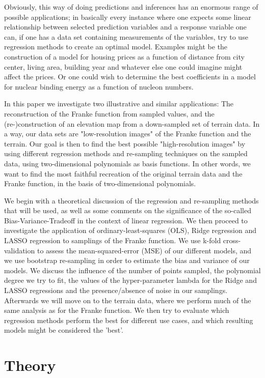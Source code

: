 \documentclass[reprint, english, nofootinbib]{revtex4-2}
\begin{document}
     Obviously, this way of doing predictions and inferences has an enormous range of possible applications; in basically every instance where one expects some linear relationship between selected prediction variables and a response variable one can, if one has a data set containing measurements of the variables, try to use regression methods to create an optimal model. Examples might be the construction of a model for housing prices as a function of distance from city center, living area, building year and whatever else one could imagine might affect the prices. Or one could wish to determine the best coefficients in a model for nuclear binding energy as a function of nucleon numbers.

     In this paper we investigate two illustrative and similar applications: The reconstruction of the Franke function from sampled values, and the (re-)construction of an elevation map from a down-sampled set of terrain data. In a way, our data sets are "low-resolution images" of the Franke function and the terrain. Our goal is then to find the best possible "high-resolution images" by using different regression methods and re-sampling techniques on the sampled data, using two-dimensional polynomials as basis functions. In other words, we want to find the most faithful recreation of the original terrain data and the Franke function, in the basis of two-dimensional polynomials.

     We begin with a theoretical discussion of the regression and re-sampling methods that will be used, as well as some comments on the significance of the so-called Bias-Variance-Tradeoff in the context of linear regression. We then proceed to investigate the application of ordinary-least-squares (OLS), Ridge regression and LASSO regression to samplings of the Franke function. We use k-fold cross-validation to assess the mean-squared-error (MSE) of our different models, and we use bootstrap re-sampling in order to estimate the bias and variance of our models. We discuss the influence of the number of points sampled, the polynomial degree we try to fit, the values of the hyper-parameter lambda for the Ridge and LASSO regressions and the presence/absence of noise in our samplings. Afterwards we will move on to the terrain data, where we perform much of the same analysis as for the Franke function. We then try to evaluate which regression methods perform the best for different use cases, and which resulting models might be considered the 'best'.


\section{Theory}
\end{document}
